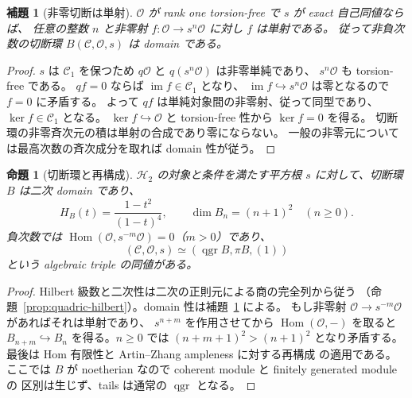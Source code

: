\documentclass[a4paper,11pt]{ltjsarticle}
\numberwithin{equation}{section}
\theoremstyle{plain}
\newtheorem{proposition}[theorem]{命題}
\newtheorem{lemma}[theorem]{補題}
\theoremstyle{definition}
\theoremstyle{remark}
\newcommand{\OO}{\mathcal O}
\newcommand{\cC}{\mathcal C}
\newcommand{\HH}{\mathcal H_2}
\DeclareMathOperator{\Hom}{Hom}
\DeclareMathOperator{\qgr}{qgr}
\begin{document}
\begin{lemma}[非零切断は単射]
\label{lem:sections-monic}
$\OO$ が rank one torsion-free で $s$ が exact 自己同値ならば、
任意の整数 $n$ と非零射 $f:\OO\to s^n\OO$ に対し $f$ は単射である。
従って非負次数の切断環 $B(\cC,\OO,s)$ は domain である。
\end{lemma}
\begin{proof}
$s$ は $\cC_1$ を保つため $q\OO$ と $q(s^n\OO)$ は非零単純であり、
$s^n\OO$ も torsion-free である。
$qf=0$ ならば $\operatorname{im}f\in\cC_1$ となり、
$\operatorname{im}f\hookrightarrow s^n\OO$ は零となるので $f=0$ に矛盾する。
よって $qf$ は単純対象間の非零射、従って同型であり、$\ker f\in\cC_1$ となる。
$\ker f\hookrightarrow\OO$ と torsion-free 性から $\ker f=0$ を得る。
切断環の非零斉次元の積は単射の合成であり零にならない。
一般の非零元については最高次数の斉次成分を取れば domain 性が従う。
\end{proof}

\begin{proposition}[切断環と再構成]
\label{prop:reconstruction}
$\HH$ の対象と条件を満たす平方根 $s$ に対して、切断環 $B$ は二次 domain であり、
\[
 H_B(t)=\frac{1-t^2}{(1-t)^4},\qquad \dim B_n=(n+1)^2\quad(n\ge0).
\]
負次数では $\Hom(\OO,s^{-m}\OO)=0$（$m>0$）であり、
\[
 (\cC,\OO,s)\simeq(\qgr B,\pi B,(1))
\]
という algebraic triple の同値がある。
\end{proposition}
\begin{proof}
Hilbert 級数と二次性は二次の正則元による商の完全列から従う
（命題~\ref{prop:quadric-hilbert}）。domain 性は補題~\ref{lem:sections-monic} による。
もし非零射 $\OO\to s^{-m}\OO$ があればそれは単射であり、
$s^{n+m}$ を作用させてから $\Hom(\OO,-)$ を取ると
$B_{n+m}\hookrightarrow B_n$ を得る。$n\ge0$ では
$(n+m+1)^2>(n+1)^2$ となり矛盾する。
最後は Hom 有限性と Artin--Zhang ampleness に対する再構成
\cite[Theorem 2.6(2)]{MU2021} の適用である。
ここでは $B$ が noetherian なので coherent module と finitely generated module の
区別は生じず、tails は通常の $\qgr$ となる。
\end{proof}
\end{document}
